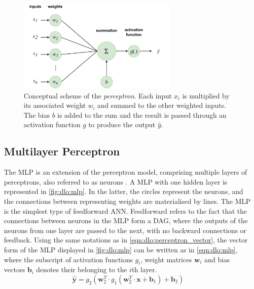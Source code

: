 \begin{figure}[htbp]
  \centering
  \includegraphics[width=0.7\textwidth]{chapter_dlo/assets/perceptron_scheme.pdf}
  \caption{Conceptual scheme of the \emph{perceptron}. Each input $x_i$ is multiplied
  by its associated weight $w_i$ and summed to the other weighted inputs. The
  bias $b$ is added to the sum and the result is passed through an activation
  function $g$ to produce the output $\hat{y}$.}
  \label{fig:dlo:perceptron}
\end{figure}

\subsection{Multilayer Perceptron}\label{sec:dlo:mlp}


The \acf{MLP} is an extension of the perceptron model, comprising multiple
layers of perceptrons, also referred to as neurons \cite{rumelhart1986learning}.
A \ac{MLP} with one hidden layer is represented in \cref{fig:dlo:mlp}. In the
latter, the circles represent the neurons, and the connections between
representing weights are materialised by lines. The \ac{MLP} is the simplest
type of feedforward \ac{ANN}. Feedforward refers to the fact that the
connections between neurons in the \ac{MLP} form a \acf{DAG}, where the outputs
of the neurons from one layer are passed to the next, with no backward
connections or feedback. Using the same notations as in
\cref{eqn:dlo:perceptron_vector}, the vector form of the \ac{MLP} displayed in
\cref{fig:dlo:mlp} can be written as in \cref{eqn:dlo:mlp}, where the subscript
of activation functions $g_i$, weight matrices $\mathbf{w}_i$ and bias vectors
$\mathbf{b}_i$ denotes their belonging to the $i$th layer.\\

\begin{equation}
  \label{eqn:dlo:mlp}
  \hat{\mathbf{y}} = g_2(\mathbf{w}_2^T \cdot  g_1(\mathbf{w}_2^T \cdot \mathbf{x} + \mathbf{b}_1) + \mathbf{b}_2)
\end{equation}\\

